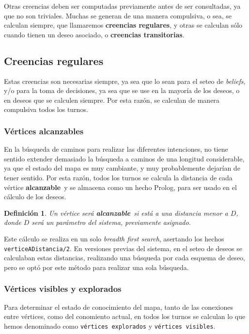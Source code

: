 \documentclass[oneside]{book}
\newtheorem{definicion}{Definición}
\begin{document}
Otras creencias deben ser computadas previamente antes de ser consultadas, ya que no
son triviales. Muchas se generan de una manera compulsiva, o sea, se calculan siempre,
que llamaremos \textbf{creencias regulares},
y otras se calculan sólo cuando tienen un deseo asociado, o \textbf{creencias 
transitorias}.


\subsection{Creencias regulares}

Estas creencias son necesarias siempre, ya sea que lo sean para el seteo de 
\textit{beliefs}, y/o para la toma de decisiones, ya sea que se use en la mayoría
de los deseos, o en deseos que se calculen siempre. Por esta razón, se calculan
de manera compulsiva todos los turnos.


\subsubsection{Vértices alcanzables}

En la búsqueda de caminos para realizar las diferentes intenciones, no tiene sentido
extender demasiado la búsqueda a caminos de una longitud considerable, ya que el 
estado del mapa es muy cambiante, y muy probablemente dejarían de tener sentido. Por
esta razón, todos los turnos se calcula la distancia de cada vértice 
\textbf{alcanzable}\ y se almacena como un hecho Prolog, para ser usado en el 
cálculo de los deseos.

\begin{definicion}
Un vértice será \textbf{alcanzable}\ si está a una distancia menor a $D$, donde $D$
será un parámetro del sistema, previamente asignado.
\end{definicion}

Este cálculo se realiza en un solo \textit{breadth first search}, asertando los hechos
\texttt{verticeADistancia/2}. En versiones previas del sistema, en el seteo de deseos
se calculaban estas distancias, realizando una búsqueda por cada esquema de deseo, 
pero se optó por este método para realizar una sola búsqueda.


\subsubsection{Vértices visibles y explorados}

Para determinar el estado de conocimiento del mapa, tanto de las conexiones
entre vértices, como del conomiento actual, en todos los turnos se calculan
lo que hemos denominado como \texttt{vértices explorados} y \texttt{vértices 
visibles}. 
\end{document}
